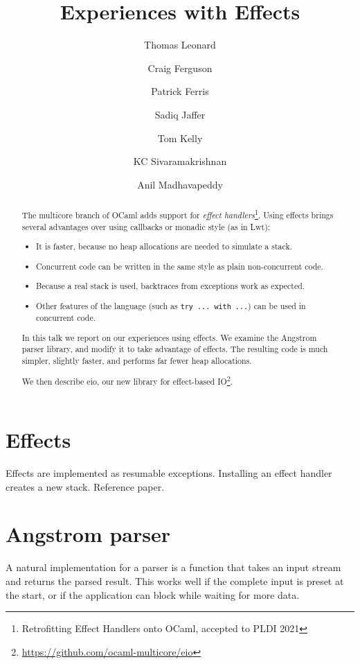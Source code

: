 \documentclass[a4paper,twocolumn]{article}
\begin{document}
\title{Experiences with Effects}
\author{Thomas Leonard\and
        Craig Ferguson\and
        Patrick Ferris\and
        Sadiq Jaffer\and
        Tom Kelly\and
        KC Sivaramakrishnan\and
        Anil Madhavapeddy}
\maketitle

\begin{abstract}
The multicore branch of OCaml adds support for \emph{effect handlers}\footnote{Retrofitting Effect Handlers onto OCaml, accepted to PLDI 2021}.
Using effects brings several advantages over using callbacks or monadic style (as in Lwt):

\begin{itemize}
\item It is faster, because no heap allocations are needed to simulate a stack.
\item Concurrent code can be written in the same style as plain non-concurrent code.
\item Because a real stack is used, backtraces from exceptions work as expected.
\item Other features of the language (such as {\tt try ... with ...}) can be used in concurrent code.
\end{itemize}

In this talk we report on our experiences using effects.
We examine the Angstrom parser library, and modify it to take advantage of effects.
The resulting code is much simpler, slightly faster, and performs far fewer heap allocations.

We then describe eio, our new library for effect-based IO\footnote{\url{https://github.com/ocaml-multicore/eio}}.

\end{abstract}

\section*{Effects}

Effects are implemented as resumable exceptions.
Installing an effect handler creates a new stack.
Reference paper.

\section*{Angstrom parser}

A natural implementation for a parser is a function that takes an input stream and returns the parsed result.
This works well if the complete input is preset at the start, or if the application can block while waiting for more data.
\end{document}
